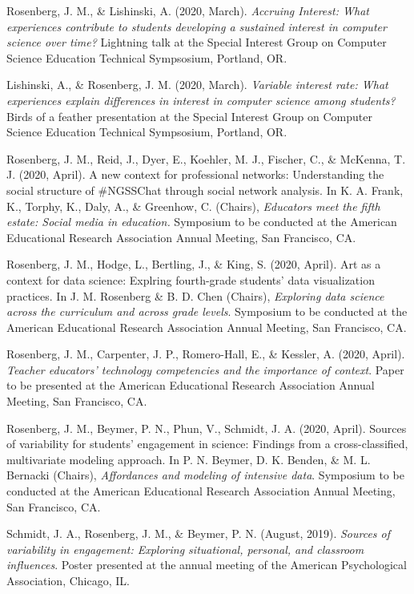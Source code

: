 \documentclass[14,]{article}
\begin{document}
Rosenberg, J. M., \& Lishinski, A. (2020, March). \emph{Accruing
Interest: What experiences contribute to students developing a sustained
interest in computer science over time?} Lightning talk at the Special
Interest Group on Computer Science Education Technical Sympsosium,
Portland, OR.

Lishinski, A., \& Rosenberg, J. M. (2020, March). \emph{Variable
interest rate: What experiences explain differences in interest in
computer science among students?} Birds of a feather presentation at the
Special Interest Group on Computer Science Education Technical
Sympsosium, Portland, OR.

Rosenberg, J. M., Reid, J., Dyer, E., Koehler, M. J., Fischer, C., \&
McKenna, T. J. (2020, April). A new context for professional networks:
Understanding the social structure of \#NGSSChat through social network
analysis. In K. A. Frank, K., Torphy, K., Daly, A., \& Greenhow, C.
(Chairs), \emph{Educators meet the fifth estate: Social media in
education.} Symposium to be conducted at the American Educational
Research Association Annual Meeting, San Francisco, CA.

Rosenberg, J. M., Hodge, L., Bertling, J., \& King, S. (2020, April).
Art as a context for data science: Explring fourth-grade students' data
visualization practices. In J. M. Rosenberg \& B. D. Chen (Chairs),
\emph{Exploring data science across the curriculum and across grade
levels}. Symposium to be conducted at the American Educational Research
Association Annual Meeting, San Francisco, CA.

Rosenberg, J. M., Carpenter, J. P., Romero-Hall, E., \& Kessler, A.
(2020, April). \emph{Teacher educators' technology competencies and the
importance of context}. Paper to be presented at the American
Educational Research Association Annual Meeting, San Francisco, CA.

Rosenberg, J. M., Beymer, P. N., Phun, V., Schmidt, J. A. (2020, April).
Sources of variability for students' engagement in science: Findings
from a cross-classified, multivariate modeling approach. In P. N.
Beymer, D. K. Benden, \& M. L. Bernacki (Chairs), \emph{Affordances and
modeling of intensive data}. Symposium to be conducted at the American
Educational Research Association Annual Meeting, San Francisco, CA.

Schmidt, J. A., Rosenberg, J. M., \& Beymer, P. N. (August, 2019).
\emph{Sources of variability in engagement: Exploring situational,
personal, and classroom influences}. Poster presented at the annual
meeting of the American Psychological Association, Chicago, IL.
\end{document}
